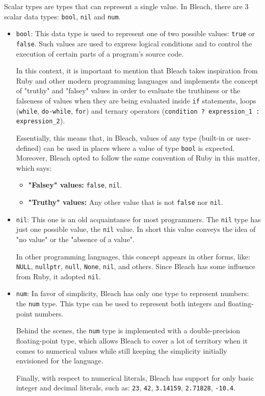 Scalar types are types that can represent a single value. In Bleach, there are 3 scalar data types: \texttt{bool}, \texttt{nil} and \texttt{num}.
\begin{itemize}
    \item \texttt{bool}: This data type is used to represent one of two possible values: \texttt{true} or \texttt{false}. Such values are used to express logical conditions and to control the execution of certain parts of a program's source code.
    
    In this context, it is important to mention that Bleach takes inspiration from Ruby and other modern programming languages and implements the concept of "truthy" and "falsey" values in order to evaluate the truthiness or the falseness of values when they are being evaluated inside \texttt{if} statements, loops (\texttt{while}, \texttt{do-while}, \texttt{for}) and ternary operators (\texttt{condition ? expression\_1 : expression\_2}).

    Essentially, this means that, in Bleach, values of any type (built-in or user-defined) can be used in places where a value of type \texttt{bool} is expected. Moreover, Bleach opted to follow the same convention of Ruby in this matter, which says:

    \begin{itemize}
        \item \textbf{"Falsey" values:} \texttt{false}, \texttt{nil}.
        \item \textbf{"Truthy" values:} Any other value that is not \texttt{false} nor \texttt{nil}.
    \end{itemize}
    
    \item \texttt{nil}: This one is an old acquaintance for most programmers. The \texttt{nil} type has just one possible value, the \texttt{nil} value. In short this value conveys the idea of "no value" or the "absence of a value".

    In other programming languages, this concept appears in other forms, like: \texttt{NULL}, \texttt{nullptr}, \texttt{null}, \texttt{None}, \texttt{nil}, and others. Since Bleach has some influence from Ruby, it adopted \texttt{nil}.
    
    \item \texttt{num}: In favor of simplicity, Bleach has only one type to represent numbers: the \texttt{num} type. This type can be used to represent both integers and floating-point numbers.

    Behind the scenes, the \texttt{num} type is implemented with a double-precision floating-point type, which allows Bleach to cover a lot of territory when it comes to numerical values while still keeping the simplicity initially envisioned for the language.
    
    Finally, with respect to numerical literals, Bleach has support for only basic integer and decimal literals, such as: \texttt{23}, \texttt{42}, \texttt{3.14159}, \texttt{2.71828}, \texttt{-10.4}.
    
\end{itemize}


